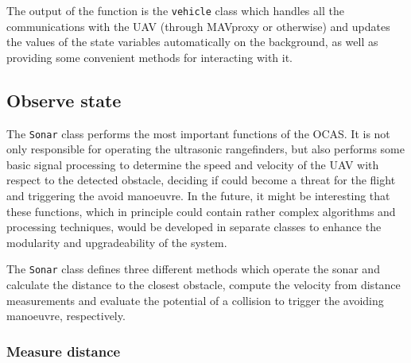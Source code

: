 The output of the function is the \texttt{vehicle} class which handles all the communications with the UAV (through MAVproxy or otherwise) and updates the values of the state variables automatically on the background, as well as providing some convenient methods for interacting with it.

\subsection{Observe state} \label{sec:sonar}

The \texttt{Sonar} class performs the most important functions of the OCAS.
It is not only responsible for operating the ultrasonic rangefinders, but also performs some basic signal processing to determine the speed and velocity of the UAV with respect to the detected obstacle, deciding if could become a threat for the flight and triggering the avoid manoeuvre.
In the future, it might be interesting that these functions, which in principle could contain rather complex algorithms and processing techniques, would be developed in separate classes to enhance the modularity and upgradeability of the system.

The \texttt{Sonar} class defines three different methods which operate the sonar and calculate the distance to the closest obstacle, compute the velocity from distance measurements and evaluate the potential of a collision to trigger the avoiding manoeuvre, respectively.

\subsubsection{Measure distance}


